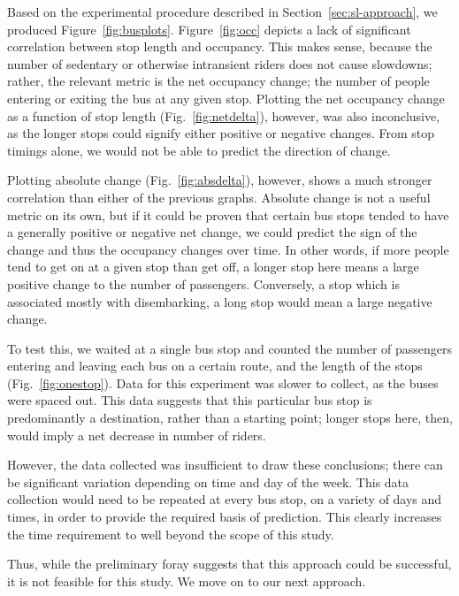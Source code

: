 Based on the experimental procedure described in Section~\ref{sec:sl-approach}, we produced Figure~\ref{fig:busplots}.
Figure~\ref{fig:occ} depicts a lack of significant correlation between stop length and occupancy.
This makes sense, because the number of sedentary or otherwise intransient riders does not cause slowdowns; rather, the relevant metric is the net occupancy change; the number of people entering or exiting the bus at any given stop.
Plotting the net occupancy change as a function of stop length (Fig.~\ref{fig:netdelta}), however, was also inconclusive, as the longer stops could signify either positive or negative changes.
From stop timings alone, we would not be able to predict the direction of change.

Plotting absolute change (Fig.~\ref{fig:absdelta}), however, shows a much stronger correlation than either of the previous graphs.
Absolute change is not a useful metric on its own, but if it could be proven that certain bus stops tended to have a generally positive or negative net change, we could predict the sign of the change and thus the occupancy changes over time.
In other words, if more people tend to get on at a given stop than get off, a longer stop here means a large positive change to the number of passengers.
Conversely, a stop which is associated mostly with disembarking, a long stop would mean a large negative change.

To test this, we waited at a single bus stop and counted the number of passengers entering and leaving each bus on a certain route, and the length of the stops (Fig.~\ref{fig:onestop}).
Data for this experiment was slower to collect, as the buses were spaced out.
This data suggests that this particular bus stop is predominantly a destination, rather than a starting point; longer stops here, then, would imply a net decrease in number of riders.

However, the data collected was insufficient to draw these conclusions; there can be significant variation depending on time and day of the week.
This data collection would need to be repeated at every bus stop, on a variety of days and times, in order to provide the required basis of prediction.
This clearly increases the time requirement to well beyond the scope of this study.

Thus, while the preliminary foray suggests that this approach could be successful, it is not feasible for this study.
We move on to our next approach.


